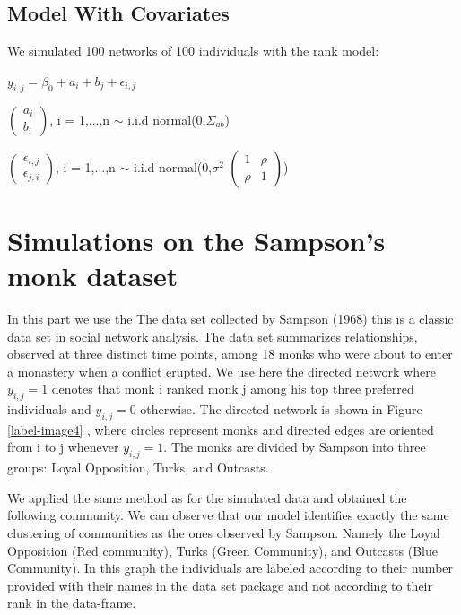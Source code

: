 \documentclass[12pt]{ociamthesis}  %
\begin{document}
	
	\section{Model With Covariates}
	
	We simulated 100 networks of 100 individuals with the rank model:
	
	$y_{i,j} = \beta_{0} + a_{i} + b_{j} + \epsilon_{i,j}$
	
	
	\(
	\begin{pmatrix}
	a_{i} \\
	b_{i}
	\end{pmatrix}
	\), i = 1,...,n $\sim $ i.i.d normal(0,$\Sigma_{ab}$)
	
	\(
	\begin{pmatrix}
	\epsilon_{i,j} \\
	\epsilon_{j,i}
	\end{pmatrix}
	\), i = 1,...,n $\sim $ i.i.d normal(0,$\sigma^{2}$ $\begin{pmatrix} 1 & \rho \\ \rho & 1 \end{pmatrix}$)
	
	
	
	
	\chapter{Simulations on the Sampson’s monk dataset}
	In this part we use the The data set collected by Sampson (1968) this is a classic data set in social network analysis. The data set summarizes relationships, observed at three distinct time points, among 18 monks who were about to enter a monastery when a conflict erupted. We use here the directed network where $y_{i,j} = 1$ denotes that monk i ranked monk j among his top three preferred individuals and $y_{i,j} = 0$ otherwise. The directed network is shown in Figure \ref{label-image4} , where circles represent monks and directed edges are oriented from i to j whenever $y_{i,j} = 1$. The monks are divided by Sampson into three groups: Loyal Opposition, Turks, and Outcasts.
	
	We applied the same method as for the simulated data and obtained the following community. We can observe that our model identifies exactly the same clustering of communities as the ones observed by Sampson. Namely the Loyal Opposition (Red community), Turks (Green Community), and Outcasts (Blue Community). In this graph the individuals are labeled according to their number provided with their names in the data set package and not according to their rank in the data-frame.
	
\end{document}

